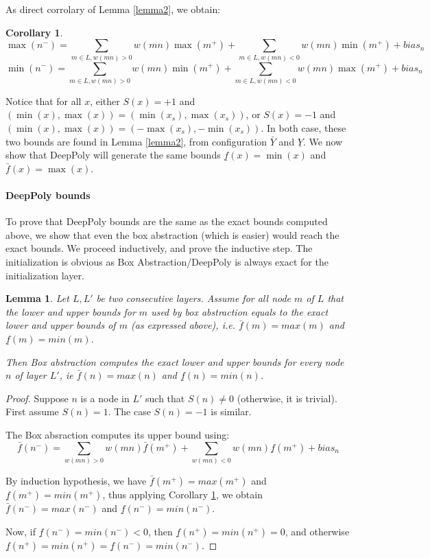 \documentclass[]{article}
\newtheorem{lemma}{Lemma}
\newtheorem{corollary}{Corollary}
\theoremstyle{definition}
\begin{document}
As direct corrolary of Lemma \ref{lemma2}, we obtain:

\begin{corollary}
	\label{cor1}
	$$\max(n^-)=\sum_{m \in L, w(m n)>0}w(m n) \max(m^+) + \sum_{m \in L, w(m n)<0}w(m n) \min(m^+) + bias_n$$
	$$\min(n^-)=\sum_{m \in L, w(m n)>0}w(m n) \min(m^+) + \sum_{m \in L, w(m n)<0}w(m n) \max(m^+) + bias_n$$
\end{corollary}
	

Notice that for all $x$, either $S(x)=+1$ and 
$(\min(x),\max(x))=(\min(x_s),\max(x_s))$, 
or $S(x)=-1$ and $(\min(x),\max(x))=(-\max(x_s),-\min(x_s))$.
In both case, these two bounds are found in Lemma \ref{lemma2},
from configuration $\bar{Y}$ and $\underline{Y}$.
We now show that DeepPoly will generate the same bounds 
$\underline{f}(x)=\min(x)$ and $\bar{f}(x)=\max(x)$.

\paragraph{DeepPoly bounds}

To prove that DeepPoly bounds are the same as the exact bounds computed above, 
we show that even the box abstraction (which is easier) would reach the exact bounds.
We proceed inductively, and prove the inductive step.
The initialization is obvious as Box Abstraction/DeepPoly is always exact for the initialization layer.

\begin{lemma}
	Let $L,L'$ be two consecutive layers.
	Assume for all node $m$ of $L$ that the lower and upper bounds for $m$ used by box abstraction equals to the exact lower and upper bounds of $m$ (as expressed above), i.e.
	$\bar{f}(m)=max(m)$ and $\underline{f}(m)=min(m)$.
	
	Then Box abstraction computes the exact lower and upper bounds for every node $n$ of layer $L'$, ie $\bar{f}(n)=max(n)$ and $\underline{f}(n)=min(n)$.
\end{lemma}

\begin{proof}
	Suppose $n$ is a node in $L'$ such that $S(n)\neq 0$ (otherwise, it is trivial). 
	First assume $S(n)=1$. The case $S(n)=-1$ is similar. 

	The Box absraction computes its upper bound using:
	$$\bar{f}(n^-)= \sum_{w(mn)>0} w(mn) \bar{f}(m^+) + \sum_{w(mn)<0} w(mn) \underline{f}(m^+) + bias_n$$

	By induction hypothesis, we have 
	$\bar{f}(m^+)=max(m^+)$ and
	$\underline{f}(m^+)=min(m^+)$, thus 
	applying Corollary \ref{cor1}, we obtain
	$\bar{f}(n^-)=max(n^-)$ and 
	$\underline{f}(n^-)=min(n^-)$.

	Now, if $\underline{f}(n^-)=min(n^-)<0$, 
	then $\underline{f}(n^+)=min(n^+)=0$, 
	and otherwise 
	$\underline{f}(n^+)=min(n^+)=\underline{f}(n^-)=min(n^-)$.

	


\end{proof}
\end{document}
